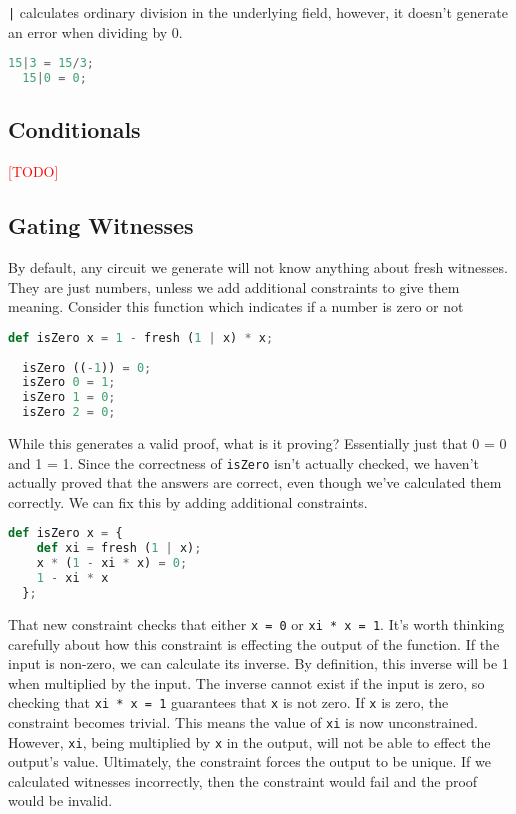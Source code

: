 \lstinline{|} calculates ordinary division in the underlying field, however, it doesn't generate an error when dividing by 0.

\begin{lstlisting}[language=Python]
  15|3 = 15/3;
  15|0 = 0;
\end{lstlisting}










\subsection{Conditionals}

\textcolor{red}{[TODO]}






\subsection{Gating Witnesses} \label{GW}

By default, any circuit we generate will not know anything about fresh witnesses. They are just numbers, unless we add additional constraints to give them meaning. Consider this function which indicates if a number is zero or not

\begin{lstlisting}[language=Python]
  def isZero x = 1 - fresh (1 | x) * x;
  
  isZero ((-1)) = 0;
  isZero 0 = 1;
  isZero 1 = 0;
  isZero 2 = 0;
\end{lstlisting}

While this generates a valid proof, what is it proving? Essentially just that 0 = 0 and 1 = 1. Since the correctness of \lstinline{isZero} isn't actually checked, we haven't actually proved that the answers are correct, even though we've calculated them correctly. We can fix this by adding additional constraints.

\begin{lstlisting}[language=Python]
  def isZero x = {
    def xi = fresh (1 | x);
    x * (1 - xi * x) = 0;
    1 - xi * x
  };
\end{lstlisting}

That new constraint checks that either \lstinline{x = 0} or \lstinline{xi * x = 1}. It's worth thinking carefully about how this constraint is effecting the output of the function. If the input is non-zero, we can calculate its inverse. By definition, this inverse will be 1 when multiplied by the input. The inverse cannot exist if the input is zero, so checking that \lstinline{xi * x = 1} guarantees that \lstinline{x} is not zero. If \lstinline{x} is zero, the constraint becomes trivial. This means the value of \lstinline{xi} is now unconstrained. However, \lstinline{xi}, being multiplied by \lstinline{x} in the output, will not be able to effect the output's value. Ultimately, the constraint forces the output to be unique. If we calculated witnesses incorrectly, then the constraint would fail and the proof would be invalid.


